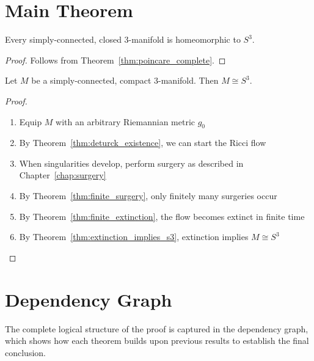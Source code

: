\section{Main Theorem}

\begin{theorem}
\label{thm:poincare_conjecture}
\leanok
{}
Every simply-connected, closed 3-manifold is homeomorphic to $S^3$.
\end{theorem}

\begin{proof}
Follows from Theorem~\ref{thm:poincare_complete}.
\end{proof}

\begin{theorem}
\label{thm:poincare_complete}
\leanok
{}
Let $M$ be a simply-connected, compact 3-manifold. Then $M \cong S^3$.
\end{theorem}

\begin{proof}
\begin{enumerate}
\item Equip $M$ with an arbitrary Riemannian metric $g_0$
\item By Theorem~\ref{thm:deturck_existence}, we can start the Ricci flow
\item When singularities develop, perform surgery as described in Chapter~\ref{chap:surgery}
\item By Theorem~\ref{thm:finite_surgery}, only finitely many surgeries occur
\item By Theorem~\ref{thm:finite_extinction}, the flow becomes extinct in finite time
\item By Theorem~\ref{thm:extinction_implies_s3}, extinction implies $M \cong S^3$
\end{enumerate}
\end{proof}

\section{Dependency Graph}

The complete logical structure of the proof is captured in the dependency graph, which shows how each theorem builds upon previous results to establish the final conclusion.

